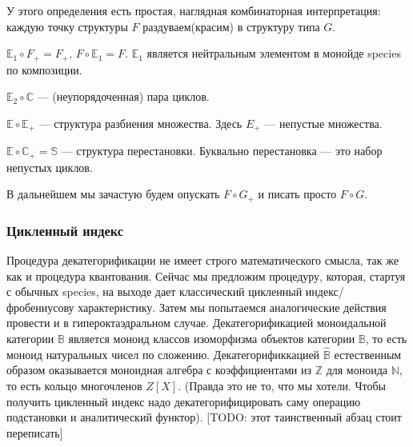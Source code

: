 У этого определения есть простая, наглядная
комбинаторная интерпретация: каждую точку структуры $F$ раздуваем(красим) в
структуру типа $G$.
\begin{example}
$\mathbb E_1 \circ F_{+} = F_{+}$, $F \circ \mathbb E_1 = F$. $\mathbb E_1$
является нейтральным элементом в монойде species по композиции.
\end{example}
\begin{example}
$\mathbb E_2 \circ \mathbb C$ --- (неупорядоченная) пара циклов.
\end{example}
\begin{example}
$\mathbb E \circ \mathbb E_{+}$ --- структура разбиения множества. Здесь $E_{+}$
--- непустые множества.
\end{example}
\begin{example}
$\mathbb E \circ \mathbb C_{+} = \mathbb S$ --- структура перестановки.
Буквально перестановка --- это набор непустых циклов.
\end{example}

В дальнейшем мы зачастую будем опускать $F \circ G_{+}$ и писать просто $F
\circ G$.

\subsubsection{Цикленный индекс}
Процедура декатегорификации не имеет строго математического смысла, так же как и процедура квантования.
Сейчас мы предложим процедуру, которая, стартуя с обычных species,
на выходе дает классический цикленный индекс/фробениусову характеристику.
Затем мы попытаемся аналогические действия провести и в гипероктаэдральном случае.
Декатегорификацией моноидальной категории $\mathbb B$ является моноид классов изоморфизма объектов категории
$\mathbb B$, то есть моноид натуральных чисел по сложению.
Декатегорификкацией $\widehat{\mathbb B}$ естественным образом оказывается
моноидная алгебра с коэффициентами из $\mathbb Z$ для моноида $\mathbb N$, то есть кольцо многочленов $Z[X]$.
(Правда это не то, что мы хотели. Чтобы получить цикленный индекс надо декатегорифицировать
саму операцию подстановки и аналитический функтор). [TODO: этот таинственный
абзац стоит переписать]

